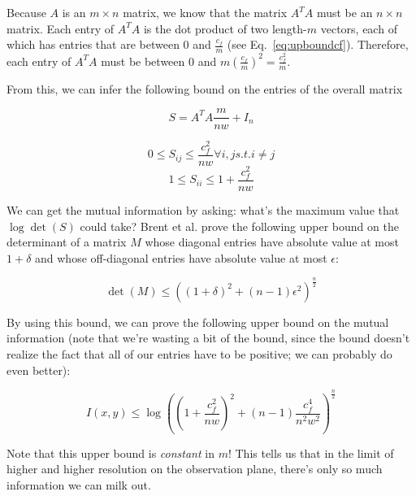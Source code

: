 \documentclass[11pt]{article}
\begin{document}
Because $A$ is an $m \times n$ matrix, we know that the matrix $A^T A$ must be an $n \times n$ matrix. Each entry of $A^T A$ is the dot product of two length-$m$ vectors, each of which has entries that are between 0 and $\frac{c_f}{m}$ (see Eq.~\ref{eq:upboundcf}). Therefore, each entry of $A^T A$ must be between 0 and $m (\frac{c_f}{m})^2 = \frac{c_f^2}{m}$.

From this, we can infer the following bound on the entries of the overall matrix 

\begin{equation}
    S = A^T A \frac{m}{n w} + I_n
\end{equation}

\begin{equation}
    0 \le S_{ij} \le \frac{c_f^2}{n w} \forall i,j s.t. i\not=j
\end{equation}
\begin{equation}
    1 \le S_{ii} \le 1+\frac{c_f^2}{n w}
\end{equation}

We can get the mutual information by asking: what's the maximum value that $\log \det (S)$ could take? Brent et al. prove the following upper bound on the determinant of a matrix $M$ whose diagonal entries have absolute value at most $1+\delta$ and whose off-diagonal entries have absolute value at most $\epsilon$:

\begin{equation}
    \det(M) \le ((1+\delta)^2 + (n-1)\epsilon^2)^{\frac{n}{2}}
\end{equation}


By using this bound, we can prove the following upper bound on the mutual information (note that we're wasting a bit of the bound, since the bound doesn't realize the fact that all of our entries have to be positive; we can probably do even better):

\begin{equation}
    I(x, y) \le \log((1 + \frac{c_f^2}{n w})^2 + (n-1)\frac{c_f^4}{n^2 w^2})^\frac{n}{2}
\end{equation}

Note that this upper bound is \emph{constant} in $m$! This tells us that in the limit of higher and higher resolution on the observation plane, there's only so much information we can milk out.

\end{document}
